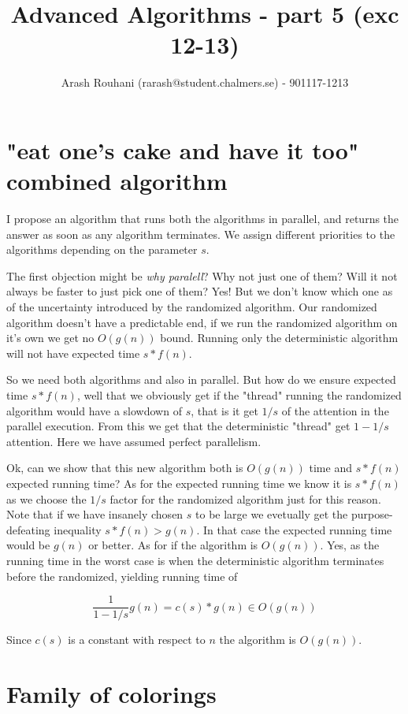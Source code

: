 \documentclass[a4paper,11pt]{article}
\title{Advanced Algorithms - part 5 (exc 12-13)}
\author{Arash Rouhani (rarash@student.chalmers.se) - 901117-1213}
\begin{document}
\maketitle

\section{"eat one's cake and have it too" combined algorithm}

I propose an algorithm that runs both the algorithms in parallel,
and returns the answer as soon as any algorithm terminates.
We assign different priorities to the algorithms depending on
the parameter $s$.

The first objection might be \emph{why paralell}? Why not just
one of them? Will it not always be faster to just pick one of them?
Yes! But we don't know which one as of the uncertainty introduced
by the randomized algorithm.
Our randomized algorithm
doesn't have a predictable end, if we run the randomized algorithm
on it's own we get no $O(g(n))$ bound. Running only the deterministic
algorithm will not have expected time $s*f(n)$.

So we need both algorithms and also in parallel.
But how do we ensure expected time $s*f(n)$, well
that we obviously get if the "thread" running the randomized
algorithm would have a slowdown of $s$, that is it get
$1/s$ of the attention in the parallel execution.
From this we get that the deterministic "thread" get
$1-1/s$ attention. Here we have assumed
perfect parallelism.

Ok, can we show that this new algorithm both is $O(g(n))$ time and
$s*f(n)$ expected running time? As for the expected running time
we know it is $s*f(n)$ as we choose the $1/s$ factor for
the randomized algorithm just for this reason. Note that if
we have insanely chosen $s$ to be large we evetually
get the purpose-defeating inequality $s*f(n) > g(n)$.
In that case the expected running time would be $g(n)$ or better.
As for if the algorithm is $O(g(n))$. Yes, as the running
time in the worst case is when the deterministic algorithm terminates
before the randomized, yielding running time of

\[
\frac{1}{1-1/s}g(n) = c(s)*g(n) \in O(g(n))
\]

Since $c(s)$ is a constant with respect to $n$ the
algorithm is $O(g(n))$.

\section{Family of colorings}
\end{document}

